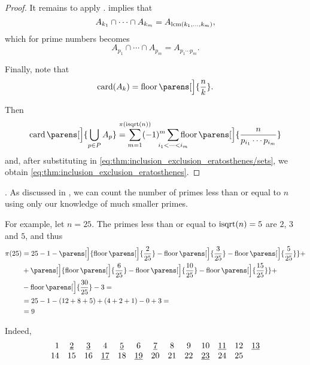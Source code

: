 \begin{proof}
  It remains to apply .  implies that
  \begin{equation*}
    A_{k_1} \cap \cdots \cap A_{k_m} = A_{\operatorname{lcm}(k_1, \ldots,k_m)},
  \end{equation*}
  which for prime numbers becomes
  \begin{equation*}
    A_{p_1} \cap \cdots \cap A_{p_m} = A_{p_1 \cdots p_m}.
  \end{equation*}

  Finally, note that
  \begin{equation*}
    \card(A_k) = \floor\parens[\Big]{ \frac n k }.
  \end{equation*}

  Then
  \begin{equation*}
    \card\parens[\Big]{ \bigcup_{p \in P} A_p } = \sum_{m=1}^{\mathclap{\pi(\op{isqrt}(n))}} (-1)^m \sum_{\mathclap{i_1 < \cdots < i_m}} \floor\parens[\Big]{ \frac n {p_{i_1} \cdots p_{i_m}} }
  \end{equation*}
  and, after substituting in \eqref{eq:thm:inclusion_exclusion_eratosthenes/sets}, we obtain \eqref{eq:thm:inclusion_exclusion_eratosthenes}.
\end{proof}

\begin{example}\label{ex:thm:inclusion_exclusion_eratosthenes}.
  As discussed in , we can count the number of primes less than or equal to \( n \) using only our knowledge of much smaller primes.

  For example, let \( n = 25 \). The primes less than or equal to \( \op{isqrt}(n) = 5 \) are \( 2 \), \( 3 \) and \( 5 \), and thus
  \begin{align*}
    \pi(25) &= 25 - 1 - \parens[\Big]{ \floor\parens[\Big]{ \frac 2 {25} } - \floor\parens[\Big]{ \frac 3 {25} } - \floor\parens[\Big]{ \frac 5 {25} } } + \\
            &+ \parens[\Big]{ \floor\parens[\Big]{ \frac 6 {25} } - \floor\parens[\Big]{ \frac {10} {25} } - \floor\parens[\Big]{ \frac {15} {25} } } + \\
            &- \floor\parens[\Big]{ \frac {30} {25} } - 3
            = \\ &= 25 - 1 - (12 + 8 + 5) + (4 + 2 + 1) - 0 + 3
            = \\ &= 9
  \end{align*}

  Indeed,
  \begin{equation*}
    \begin{array}{r *{23}{c}}
      1  & \hi{2} & \hi{3} & 4       & \hi{5} & 6       & \hi{7} & 8  & 9  & 10      & \hi{11} & 12 & \hi{13} \\
      14 & 15     & 16     & \hi{17} & 18     & \hi{19} & 20     & 21 & 22 & \hi{23} & 24      & 25 &
    \end{array}
  \end{equation*}
\end{example}

